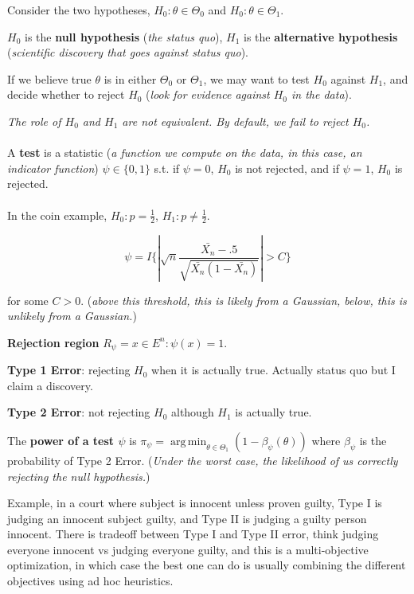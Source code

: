 \documentclass{article}
\DeclareMathOperator*{\argmin}{arg\,min}
\begin{document}
Consider the two hypotheses, $H_0 : \theta \in \Theta_0$ and $H_0 : \theta \in \Theta_1$.

$H_0$ is the \textbf{null hypothesis} (\textit{the status quo}), $H_1$ is the \textbf{alternative hypothesis} (\textit{scientific discovery that goes against status quo}).

If we believe true $\theta$ is in either $\Theta_0$ or $\Theta_1$, we may want to test $H_0$ against $H_1$, and decide whether to reject $H_0$ (\textit{look for evidence against $H_0$ in the data}).

\textit{The role of $H_0$ and $H_1$ are not equivalent. By default, we fail to reject $H_0$.}
\\
\\
A \textbf{test} is a statistic (\textit{a function we compute on the data, in this case, an indicator function}) $\psi \in \{0, 1\}$ s.t. if $\psi = 0$, $H_0$ is not rejected, and if $\psi = 1$, $H_0$ is rejected.
\\
\\
In the coin example, $H_0: p = \frac{1}{2}$, $H_1: p \neq \frac{1}{2}$.

$$
\psi = I\{|\sqrt{n} \frac{\bar{X_n} - .5}{\sqrt{\bar{X_n} (1 - \bar{X_n})}}| > C\}
$$

for some $C > 0$. (\textit{above this threshold, this is likely from a Gaussian, below, this is unlikely from a Gaussian.})

\textbf{Rejection region} $R_{\psi} = { x \in E^n : \psi(x) = 1}$.

\textbf{Type 1 Error}: rejecting $H_0$ when it is actually true. Actually status quo but I claim a discovery.

\textbf{Type 2 Error}: not rejecting $H_0$ although $H_1$ is actually true.

The \textbf{power of a test $\psi$} is $\pi_{\psi} = \argmin_{\theta \in \Theta_1} (1 - \beta_{\psi}(\theta))$ where $\beta_{\psi}$ is the probability of Type 2 Error.
(\textit{Under the worst case, the likelihood of us correctly rejecting the null hypothesis.})

Example, in a court where subject is innocent unless proven guilty, Type I is judging an innocent subject guilty, and Type II is judging a guilty person innocent.
There is tradeoff between Type I and Type II error, think judging everyone innocent vs judging everyone guilty, and this is a multi-objective optimization, in which case the best one can do is usually combining the different objectives using ad hoc heuristics.
\end{document}
